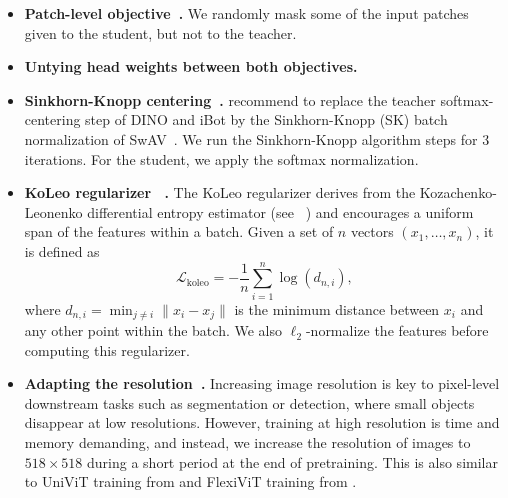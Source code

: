 \begin{itemize}
We learn the parameters of the student and build the teacher head with an exponential moving average of past iterates~\citep{he2020momentum}. 
\item
\textbf{Patch-level objective~\citep{zhou2021ibot}.} We randomly mask some of the input patches given to the student, but not to the teacher.
\item
\textbf{Untying head weights between both objectives.}
\item
\textbf{Sinkhorn-Knopp centering~\citep{caron2020unsupervised}.} \cite{ruan2022weighted} recommend to replace the teacher softmax-centering step of DINO and iBot by the Sinkhorn-Knopp (SK) batch normalization of SwAV~\citep{caron2020unsupervised}. We run the Sinkhorn-Knopp algorithm steps for 3 iterations. For the student, we apply the softmax normalization.
\item
\textbf{KoLeo regularizer ~\citep{sablayrolles2018spreading}.} The KoLeo regularizer derives from the Kozachenko-Leonenko differential entropy estimator (see ~\citet{beirlant1997nonparametric,delattre2017kozachenko}) and encourages a uniform span of the features within a batch. Given a set of $n$ vectors $(x_1,\dots,x_n)$, it is defined as $${\mathcal L}_{\mathrm{koleo}} = - \frac{1}{n} \sum_{i=1}^n \log( d_{n, i}),$$ where $ d_{n, i} = \min_{j \neq i} \| x_i - x_j \| $ is the minimum distance between $x_i$ and any other point within the batch. We also $\ell_2$-normalize the features before computing this regularizer. 
\item
\textbf{Adapting the resolution~\citep{touvron2019fixing}.} Increasing image resolution is key to pixel-level downstream tasks such as segmentation or detection, where small objects disappear at low resolutions. However, training at high resolution is time and memory demanding, and instead, we increase the resolution of images to $518\times 518$ during a short period at the end of pretraining. This is also similar to UniViT training from \cite{likhomanenko2021cape} and FlexiViT training from \cite{beyer2023flexivit}.
\end{itemize}

